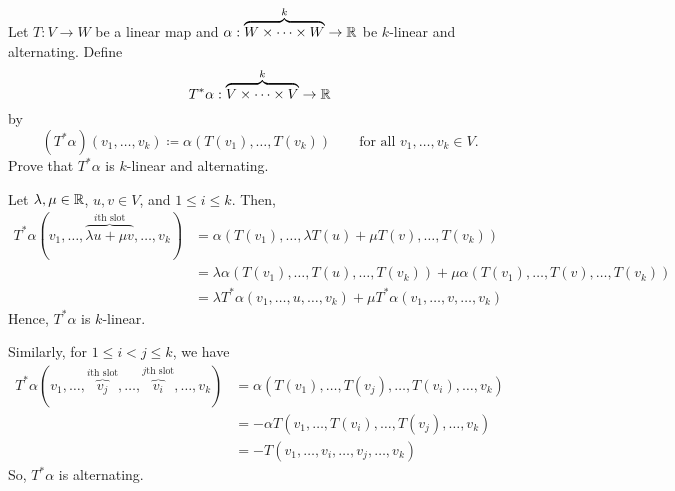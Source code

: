 \documentclass{article}
\begin{document}
\begin{problem}
Let $T : V \to W$ be a linear map and $\alpha : \overbrace{W \times \dots \times W}^{k} \to \mathbb{R}$ be $k$-linear and alternating.
Define
\[
	T^* \alpha : \overbrace{V \times \dots \times V}^{k} \to \mathbb{R}
\]
by
\[
	(T^* \alpha)(v_1, \dots, v_k) \coloneq \alpha (T(v_1), \dots, T(v_k)) \qquad \text{for all $v_1, \dots, v_k \in V$}.
\]
Prove that $T^* \alpha$ is $k$-linear and alternating.
\end{problem}
\begin{solution}
	Let $\lambda, \mu \in \mathbb{R}$, $u, v \in V$, and $1 \le i \le k$.
	Then,
	\begin{align*}
		T^* \alpha (v_1, \dots, \overbrace{\lambda u + \mu v}^{\text{$i$th slot}}, \dots, v_k) & = \alpha (T(v_1), \dots, \lambda T(u) + \mu T(v), \dots, T(v_k))                                                                     \\
		                                                                                       & = \lambda \alpha (T(v_1), \dots, T(u), \dots, T(v_k)) + \mu \alpha (T(v_1), \dots, T(v), \dots, T(v_k)) \tag{$\alpha$ is $k$-linear} \\
		                                                                                       & = \lambda T^* \alpha (v_1, \dots, u, \dots, v_k) + \mu T^* \alpha (v_1, \dots, v, \dots, v_k)
	\end{align*}
	Hence, $T^* \alpha$ is $k$-linear.

	Similarly, for $1 \le i < j \le k$, we have
	\begin{align*}
		T^* \alpha (v_1, \dots, \overbrace{v_j}^{\text{$i$th slot}}, \dots, \overbrace{v_i}^{\text{$j$th slot}}, \dots, v_k) & = \alpha(T(v_1), \dots, T(v_j), \dots, T(v_i), \dots, v_k)                                \\
		                                                                                                                     & = - \alpha T(v_1, \dots, T(v_i), \dots, T(v_j), \dots, v_k) \tag{$\alpha$ is alternating} \\
		                                                                                                                     & = - T(v_1, \dots, v_i, \dots, v_j, \dots, v_k)
	\end{align*}
	So, $T^* \alpha$ is alternating.
\end{solution}
\end{document}
